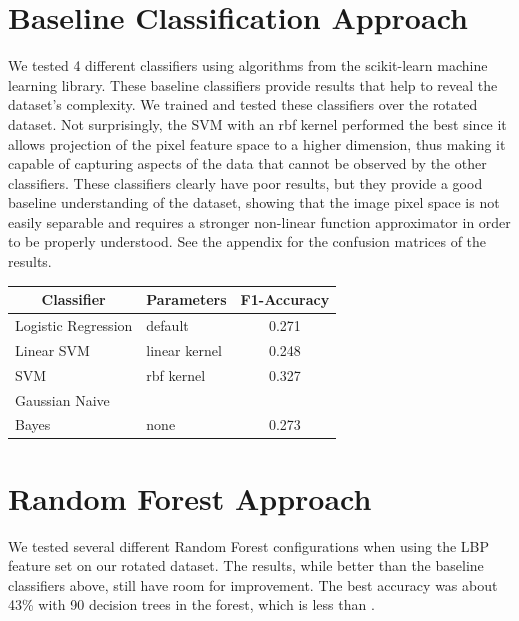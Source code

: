 \begin{multicols}{2}
\section{Baseline Classification Approach}
We tested 4 different classifiers using algorithms from the scikit-learn \citet{scikit-learn} machine learning library. These baseline classifiers provide results that help to reveal the dataset's complexity. We trained and tested these classifiers over the rotated dataset. Not surprisingly, the SVM with an rbf kernel performed the best since it allows projection of the pixel feature space to a higher dimension, thus making it capable of capturing aspects of the data that cannot be observed by the other classifiers. These classifiers clearly have poor results, but they provide a good baseline understanding of the dataset, showing that the image pixel space is not easily separable and requires a stronger non-linear function approximator in order to be properly understood. See the appendix for the confusion matrices of the results.

\begin{center}
	\begin{tabular}{llc}
	\toprule
	\multicolumn{1}{c}{\textbf{Classifier}} & \textbf{Parameters} & \textbf{F1-Accuracy} \\ 
	\midrule
	Logistic Regression  & default         & 0.271 \\ 
	Linear 	SVM   	     & linear kernel   & 0.248 \\
	SVM                  & rbf kernel      & 0.327 \\
	Gaussian Naive \\Bayes & none            & 0.273 \\ \bottomrule
	\end{tabular}
\end{center}

\section{Random Forest Approach}
We tested several different Random Forest configurations when using the LBP feature set on our rotated dataset. The results, while better than the baseline classifiers above, still have room for improvement. The best accuracy was about 43\% with 90 decision trees in the forest, which is less than \citet{kylberg2011virus}. 


\end{multicols}
